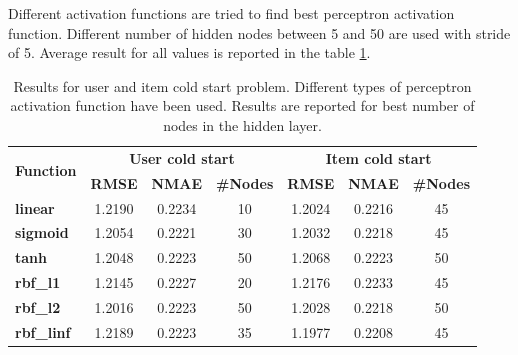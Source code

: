 \documentclass[paper=a4, fontsize=11pt]{scrartcl} %
\numberwithin{equation}{section} %
\numberwithin{figure}{section} %
\numberwithin{table}{section} %
\begin{document}
Different activation functions are tried to find best perceptron activation function. Different number of hidden nodes between 5 and 50 are used with stride of 5. Average result for all values is reported in the table \ref{table:results}.

\begin{table}
\centering
\begin{tabular}{l c c c c c c} \toprule[0.2mm]
\multirow{2}{*}{\textbf{Function}} & \multicolumn{3}{c}{\textbf{User cold start}} & \multicolumn{3}{c}{\textbf{Item cold start}} \\ \cmidrule{2-7}
& \textbf{RMSE} & \textbf{NMAE} & \textbf{\#Nodes} & \textbf{RMSE} & \textbf{NMAE} & \textbf{\#Nodes} \\ \midrule
\textbf{linear} & 1.2190 & 0.2234 & 10 & 1.2024 & 0.2216 & 45 \\
\textbf{sigmoid} & 1.2054 & 0.2221 & 30 & 1.2032 & 0.2218 & 45 \\
\textbf{tanh} & 1.2048 & 0.2223 & 50 & 1.2068 & 0.2223 & 50 \\
\textbf{rbf\_l1} & 1.2145 & 0.2227 & 20 & 1.2176 & 0.2233 & 45 \\
\textbf{rbf\_l2} & 1.2016 & 0.2223 & 50 & 1.2028 & 0.2218 &  50 \\
\textbf{rbf\_linf} & 1.2189 & 0.2223 & 35 & 1.1977 & 0.2208 & 45 \\
\bottomrule[0.2mm]
\end{tabular}
\caption{Results for user and item cold start problem. Different types of perceptron activation function have been used. Results are reported for best number of nodes in the hidden layer.}
\label{table:results}
\end{table}
\end{document}
